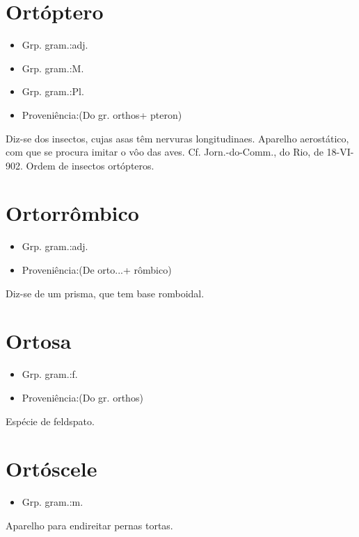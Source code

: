 \section{Ortóptero}
\begin{itemize}
\item {Grp. gram.:adj.}
\end{itemize}
\begin{itemize}
\item {Grp. gram.:M.}
\end{itemize}
\begin{itemize}
\item {Grp. gram.:Pl.}
\end{itemize}
\begin{itemize}
\item {Proveniência:(Do gr. \textunderscore orthos\textunderscore  + \textunderscore pteron\textunderscore )}
\end{itemize}
Diz-se dos insectos, cujas asas têm nervuras longitudinaes.
Aparelho aerostático, com que se procura imitar o vôo das aves. Cf. \textunderscore Jorn.-do-Comm.\textunderscore , do Rio, de 18-VI-902.
Ordem de insectos ortópteros.
\section{Ortorrômbico}
\begin{itemize}
\item {Grp. gram.:adj.}
\end{itemize}
\begin{itemize}
\item {Proveniência:(De \textunderscore orto...\textunderscore  + \textunderscore rômbico\textunderscore )}
\end{itemize}
Diz-se de um prisma, que tem base romboidal.
\section{Ortosa}
\begin{itemize}
\item {Grp. gram.:f.}
\end{itemize}
\begin{itemize}
\item {Proveniência:(Do gr. \textunderscore orthos\textunderscore )}
\end{itemize}
Espécie de feldspato.
\section{Ortóscele}
\begin{itemize}
\item {Grp. gram.:m.}
\end{itemize}
Aparelho para endireitar pernas tortas.
